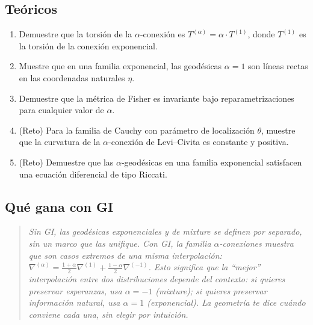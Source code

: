 \subsection*{Teóricos}
\begin{enumerate}[resume]
	\item[$\star\star\star$] Demuestre que la torsión de la $\alpha$-conexión es $T^{(\alpha)} = \alpha \cdot T^{(1)}$, donde $T^{(1)}$ es la torsión de la conexión exponencial.
	\item[$\star\star\star$] Muestre que en una familia exponencial, las geodésicas $\alpha = 1$ son líneas rectas en las coordenadas naturales $\eta$.
	\item[$\star\star\star$] Demuestre que la métrica de Fisher es invariante bajo reparametrizaciones para cualquier valor de $\alpha$.
	\item[$\star\star\star\star$] (Reto) Para la familia de Cauchy con parámetro de localización $\theta$, muestre que la curvatura de la $\alpha$-conexión de Levi--Civita es constante y positiva.
	\item[$\star\star\star\star$] (Reto) Demuestre que las $\alpha$-geodésicas en una familia exponencial satisfacen una ecuación diferencial de tipo Riccati.
\end{enumerate}

\subsection*{Qué gana con GI}
\begin{quote}
	\itshape
	Sin GI, las geodésicas exponenciales y de mixture se definen por separado, sin un marco que las unifique.  Con GI, la familia $\alpha$-conexiones muestra que son casos extremos de una misma interpolación: $\nabla^{(\alpha)} = \frac{1+\alpha}{2} \nabla^{(1)} + \frac{1-\alpha}{2} \nabla^{(-1)}$.  Esto significa que la ``mejor'' interpolación entre dos distribuciones depende del contexto: si quieres preservar esperanzas, usa $\alpha = -1$ (mixture); si quieres preservar información natural, usa $\alpha = 1$ (exponencial).  La geometría te dice cuándo conviene cada una, sin elegir por intuición.
\end{quote}
